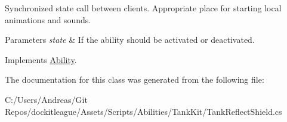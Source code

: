 Synchronized state call between clients. Appropriate place for starting local animations and sounds. 


\begin{DoxyParams}{Parameters}
{\em state} & If the ability should be activated or deactivated.\\
\hline
\end{DoxyParams}


Implements \hyperlink{class_ability_a10f7f3c2b63eeef6e352aee48d246384}{Ability}.



The documentation for this class was generated from the following file\+:\begin{DoxyCompactItemize}
\item 
C\+:/\+Users/\+Andreas/\+Git Repos/dockitleague/\+Assets/\+Scripts/\+Abilities/\+Tank\+Kit/Tank\+Reflect\+Shield.\+cs\end{DoxyCompactItemize}
